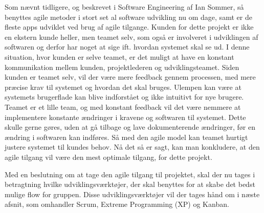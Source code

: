 Som nævnt tidligere, og beskrevet i Software Engineering af Ian Sommer, så benyttes agile metoder i stort set al software udvikling nu om dage, samt er de fleste apps udviklet ved brug af agile tilgange. \cite{Sommerville} Kunden for dette projekt er ikke en ekstern kunde heller, men teamet selv, som også er involveret i udviklingen af softwaren og derfor har noget at sige ift. hvordan systemet skal se ud. I denne situation, hvor kunden er selve teamet, er det muligt at have en konstant kommunikation mellem kunden, projektlederen og udviklingsteamet. Siden kunden er teamet selv, vil der være mere feedback gennem processen, med mere præcise krav til systemet og hvordan det skal bruges. Ulempen kan være at systemets brugerflade kan blive indforstået og ikke intuitivt for nye brugere.  Teamet er et lille team, og med konstant feedback vil det være nemmere at implementere konstante ændringer i kravene og softwaren til systemet. Dette skulle gerne gøres, uden at gå tilbage og lave dokumenterende ændringer, før en ændring i softwaren kan indføres. Så med den agile model kan teamet hurtigt justere systemet til kundes behov. Nå det så er sagt, kan man konkludere, at den agile tilgang vil være den mest optimale tilgang, for dette projekt.

Med en beslutning om at tage den agile tilgang til projektet, skal der nu tages i betragtning hvilke udviklingsværktøjer, der skal benyttes for at skabe det bedst mulige flow for gruppen. Disse udviklingsværktøjer vil der tages hånd om i næste afsnit, som omhandler Scrum, Extreme Programming (XP) og Kanban.
